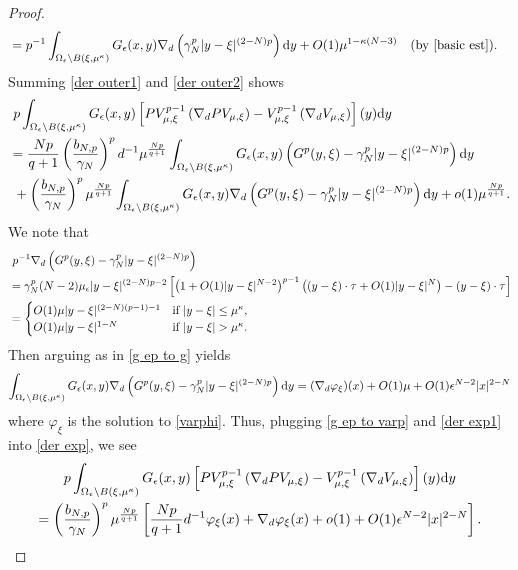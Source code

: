 \documentclass[reqno]{amsart}
\theoremstyle{remark}
\newcommand{\ep}{\epsilon}
\newcommand{\ga}{\gamma}
\newcommand{\dy}{\textup{d}y}
\newcommand{\mx}{{\mu,\xi}}
\renewcommand{\(}{\left(}
\renewcommand{\)}{\right)}
\numberwithin{equation}{section}
\begin{document}
\begin{proof}
\begin{align*}
&=p^{-1}\int_{\Omega_\ep \setminus B(\xi,\mu^\kappa)} G_\ep(x,y) \nabla_d\(\ga_N^p|y-\xi|^{(2-N)p}\)\dy + O(1)\mu^{1-\kappa(N-3)} \quad \text{(by \eqref{basic est}}).
\end{align*}
Summing \eqref{der outer1} and \eqref{der outer2} shows
\begin{equation}\label{der exp}
\begin{aligned}
&\ p\int_{\Omega_\ep \setminus B(\xi,\mu^\kappa)} G_\ep(x,y) \left[PV_\mx^{p-1} \(\nabla_d PV_\mx\) - V_\mx^{p-1} \(\nabla_d V_\mx\)\right](y)\dy \\
&= \frac{Np}{q+1}\(\frac{b_{N,p}}{\ga_N}\)^p d^{-1}\mu^{\frac{Np}{q+1}} \int_{\Omega_\ep \setminus B(\xi,\mu^\kappa)} G_\ep(x,y) \(G^p(y,\xi)-\ga_N^p|y-\xi|^{(2-N)p}\)\dy\\
&\ +\(\frac{b_{N,p}}{\ga_N}\)^p\mu^{\frac{Np}{q+1}}\int_{\Omega_\ep \setminus B(\xi,\mu^\kappa)} G_\ep(x,y) \nabla_d \(G^p(y,\xi)-\ga_N^p|y-\xi|^{(2-N)p}\)\dy + o(1)\mu^{\frac{Np}{q+1}}.
\end{aligned}
\end{equation}
We note that
\begin{align*}
&\ p^{-1} \nabla_d \(G^p(y,\xi)-\ga_N^p|y-\xi|^{(2-N)p}\)\\
&= \ga_N^p(N-2)\mu_\ep |y-\xi|^{(2-N)p-2} \left[\(1+O(1)|y-\xi|^{N-2}\)^{p-1}\((y-\xi) \cdot \tau+O(1) |y-\xi|^N\)-(y-\xi)\cdot \tau\right]\\
&= \begin{cases}
O(1)\mu |y-\xi|^{(2-N)(p-1)-1} &\textup{if } |y-\xi|\le \mu^\kappa,\\
O(1)\mu |y-\xi|^{1-N} &\textup{if } |y-\xi|> \mu^\kappa.
\end{cases}
\end{align*}
Then arguing as in \eqref{g ep to g} yields
\begin{equation}\label{der exp1}
\int_{\Omega_\ep \setminus B(\xi,\mu^\kappa)} G_\ep(x,y) \nabla_d \(G^p(y,\xi)-\ga_N^p|y-\xi|^{(2-N)p}\)\dy
= (\nabla_d \varphi_\xi)(x)+O(1)\mu+O(1)\ep^{N-2}|x|^{2-N}
\end{equation}
where $\varphi_\xi$ is the solution to \eqref{varphi}. Thus, plugging \eqref{g ep to varp} and \eqref{der exp1} into
\eqref{der exp}, we see
\begin{multline}\label{outer c1}
p\int_{\Omega_\ep \setminus B(\xi,\mu^\kappa)} G_\ep(x,y) \left[PV_\mx^{p-1} \(\nabla_d PV_\mx\) - V_\mx^{p-1} \(\nabla_d V_\mx\)\right](y)\dy\\
=\(\frac{b_{N,p}}{\ga_N}\)^p\mu^{\frac{Np}{q+1}} \left[\frac{Np}{q+1}d^{-1}\varphi_\xi(x)+\nabla_d \varphi_\xi(x)+o(1)+O(1)\ep^{N-2}|x|^{2-N}\right].
\end{multline}


\end{proof}
\end{document}
